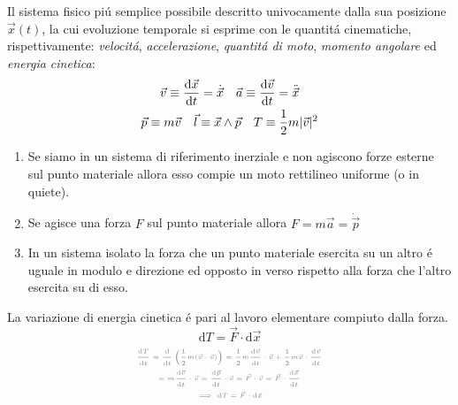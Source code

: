 \begin{multicols}{3}
  Il sistema fisico pi\'u semplice possibile descritto univocamente dalla sua
  posizione $\vec{x}(t)$, la cui evoluzione temporale si esprime con le
  quantit\'a cinematiche, rispettivamente: \textit{velocit\'a},
  \textit{accelerazione}, \textit{quantit\'a di moto},
  \textit{momento angolare} ed \textit{energia cinetica}:
  \begin{equation}
    \label{eq:quantita-cinematiche}
    \begin{gathered}
      \vec{v} \equiv \dv{\vec{x}}{t} = \dot{\vec{x}}
      \quad
      \vec{a} \equiv \dv{\vec{v}}{t} = \ddot{\vec{x}} \\
      \vec{p} \equiv m \vec{v}
      \quad
      \vec{l} \equiv \vec{x} \wedge \vec{p}
      \quad
      T \equiv \frac{1}{2}m|\vec{v}|^2
    \end{gathered}
  \end{equation}

  \begin{enumerate}
  \item Se siamo in un sistema di riferimento inerziale e non agiscono forze
    esterne sul punto materiale allora esso compie un moto rettilineo uniforme
    (o in quiete).
  \item Se agisce una forza $F$ sul punto materiale allora
    $F = m\vec{a} = \dot{\vec{p}}$
  \item In un sistema isolato la forza che un punto materiale esercita su un
    altro \'e uguale in modulo e direzione ed opposto in verso rispetto alla
    forza che l'altro esercita su di esso.
  \end{enumerate}

  La variazione di energia cinetica \'e pari al lavoro elementare compiuto
  dalla forza.
  \begin{equation}
    \label{eq:teorema-cinetica}
    \text{d}T = \vec{F} \cdot \text{d}\vec{x}
  \end{equation}
  \begin{equation*}
    \myproof{
    \begin{gathered}
      \dv{T}{t} =
      \dv{t}\left(\frac{1}{2}m(\vec{v}\cdot\vec{v})\right) =
      \frac{1}{2}m\dv{\vec{v}}{t}\cdot\vec{v} +
      \frac{1}{2}m\vec{v}\cdot\dv{\vec{v}}{t} \\ =
      m\dv{\vec{v}}{t}\cdot\vec{v} = \dv{\vec{p}}{t}\cdot\vec{v} =
      \vec{F} \cdot \vec{v} = \vec{F} \cdot \dv{\vec{x}}{t} \\
      \implies \text{d}T = \vec{F} \cdot \text{d}\vec{x}
    \end{gathered}}
  \end{equation*}


\end{multicols}
